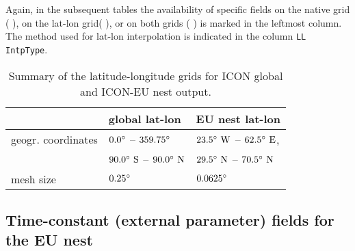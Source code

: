 Again, in the subsequent tables the availability of specific fields on the native grid ($\,$\markRed$\,$), 
on the lat-lon grid($\,$\markBlue$\,$), or on both grids ($\,$\markRed\markBlue$\,$) is marked in the leftmost 
column. The method used for lat-lon interpolation is indicated in the column \texttt{LL IntpType}.
%
\begin{table}[hbt]
  \centering
  \begin{tabular}{|p{5cm}|p{4.5cm}|p{4.5cm}|}\hline
    \rowcolor{Gray}
                               &    \centering\arraybackslash\textbf{global lat-lon}          &     \centering\arraybackslash\textbf{EU nest lat-lon} \\ \hline\hline
    geogr. coordinates         &    $  0.0^{\circ}$          -- $359.75^{\circ}$                     &     $ 23.5^{\circ}~\text{W}$ -- $62.5^{\circ}~\text{E}$, \\
                               &    $ 90.0^{\circ}~\text{S}$ -- $ 90.0^{\circ}~\text{N}$              &     $ 29.5^{\circ}~\text{N}$ -- $70.5^{\circ}~\text{N}$ \\
    mesh size                  &    $0.25^{\circ}$                                &     $0.0625^{\circ}$ \\
    \hline
  \end{tabular}
  \caption{Summary of the latitude-longitude grids for ICON global and ICON-EU nest output.}%
  \label{tab:ICON_latlon_summary}
\end{table}

\newpage
\subsection{Time-constant (external parameter) fields for the EU nest}

\renewcommand{\onlyglb}[1]{}
\renewcommand{\onlyloc}[1]{#1}
%
\begin{vartable}{\label{table:nest:init_output}}

  

\end{vartable}


